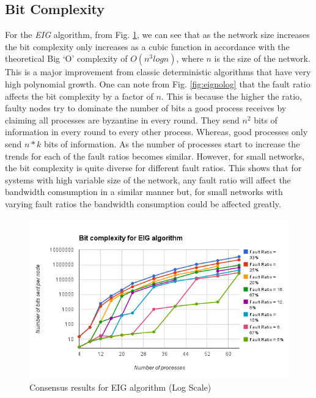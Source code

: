 \subsection{Bit Complexity}
For the \textit{EIG} algorithm, from Fig. \ref{fig:eig}, we can see that as the network size increases the bit complexity only increases as a cubic function in accordance with the theoretical Big `O' complexity of $O(n^3 logn)$, where $n$ is the size of the network. This is a major improvement from classic deterministic algorithms that have very high polynomial growth. One can note from Fig. \ref{fig:eignolog} that the fault ratio affects the bit complexity by a factor of $n$. This is because the higher the ratio, faulty nodes try to dominate the number of bits a good process receives by claiming all processes are byzantine in every round. They send $n^2$ bits of information in every round to every other process. Whereas, good processes only send $n*k$ bits of information. As the number of processes start to increase the trends for each of the fault ratios becomes similar. However, for small networks, the bit complexity is quite diverse for different fault ratios. This shows that for systems with high variable size of the network, any fault ratio will affect the bandwidth comsumption in a similar manner but, for small networks with varying fault ratios the bandwidth consumption could be affected greatly.   
\begin{figure}[h]
 \centering
\includegraphics[scale=0.4]{eig}
\caption{Consensus results for EIG algorithm (Log Scale)}
 \label{fig:eig}
\end{figure}

